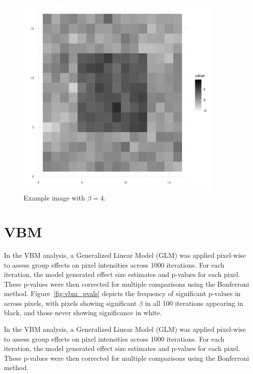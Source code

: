 \documentclass[12pt]{article}
\begin{document}
\begin{figure}[H]
  \begin{minipage}[b]{0.45\textwidth}
    \centering
    \includegraphics[width=0.9\textwidth]{../Figures/ex_image_4.png}
    \caption{Example image with \(\beta = 4\).}
    \label{fig:image3}
  \end{minipage}
\end{figure}

\section*{VBM}

In the VBM analysis, a Generalized Linear Model (GLM) was applied pixel-wise to assess group effects on pixel intensities across 1000 iterations. For each iteration, the model generated effect size estimates and p-values for each pixel. These p-values were then corrected for multiple comparisons using the Bonferroni method. Figure~\ref{fig:vbm_pvals} depicts the frequency of significant p-values in across pixels, with pixels showing significant \(\beta\) in all 100 iterations appearing in black, and those never showing significance in white.

In the VBM analysis, a Generalized Linear Model (GLM) was applied pixel-wise to assess group effects on pixel intensities across 1000 iterations. For each iteration, the model generated effect size estimates and p-values for each pixel. These p-values were then corrected for multiple comparisons using the Bonferroni method.
\end{document}
